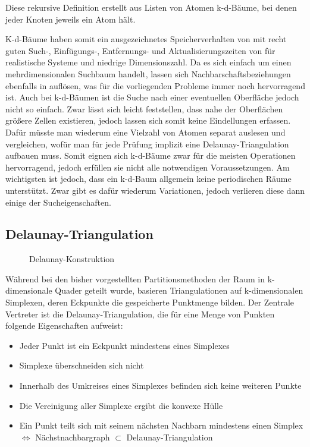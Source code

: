 Diese rekursive Definition erstellt aus Listen von Atomen k-d-Bäume, bei denen jeder Knoten jeweils ein Atom hält.

K-d-Bäume haben somit ein ausgezeichnetes Speicherverhalten von  mit recht guten Such-, Einfügungs-, Entfernungs- und Aktualisierungszeiten von  für realistische Systeme und niedrige Dimensionszahl.
Da es sich einfach um einen mehrdimensionalen Suchbaum handelt, lassen sich Nachbarschaftsbeziehungen ebenfalls in  auflösen, was für die vorliegenden Probleme immer noch hervorragend ist.
Auch bei k-d-Bäumen ist die Suche nach einer eventuellen Oberfläche jedoch nicht so einfach.
Zwar lässt sich leicht feststellen, dass nahe der Oberflächen größere Zellen existieren, jedoch lassen sich somit keine Eindellungen erfassen.
Dafür müsste man wiederum eine Vielzahl von Atomen separat auslesen und vergleichen, wofür man für jede Prüfung implizit eine Delaunay-Triangulation aufbauen muss.
Somit eignen sich k-d-Bäume zwar für die meisten Operationen hervorragend, jedoch erfüllen sie nicht alle notwendigen Voraussetzungen.
Am wichtigsten ist jedoch, dass ein k-d-Baum allgemein keine periodischen Räume unterstützt.
Zwar gibt es dafür wiederum Variationen, jedoch verlieren diese dann einige der Sucheigenschaften.

\subsection{Delaunay-Triangulation}

\begin{figure}[bhpt]
  \centering
  \def\svgwidth{\textwidth}
  
  \caption[Delaunay-Konstruktion]{Delaunay-Konstruktion}
  \label{fig:delaunay}
\end{figure}

Während bei den bisher vorgestellten Partitionsmethoden der Raum in k-dimensionale Quader geteilt wurde, basieren Triangulationen auf k-dimensionalen Simplexen, deren Eckpunkte die gespeicherte Punktmenge bilden.
Der Zentrale Vertreter ist die Delaunay-Triangulation, die für eine Menge von Punkten folgende Eigenschaften aufweist:

\begin{itemize}
\item Jeder Punkt ist ein Eckpunkt mindestens eines Simplexes
\item Simplexe überschneiden sich nicht
\item Innerhalb des Umkreises eines Simplexes befinden sich keine weiteren Punkte
\item Die Vereinigung aller Simplexe ergibt die konvexe Hülle
\item Ein Punkt teilt sich mit seinem nächsten Nachbarn mindestens einen Simplex \\
$\Leftrightarrow$ Nächstnachbargraph $\subset$ Delaunay-Triangulation
\end{itemize}

